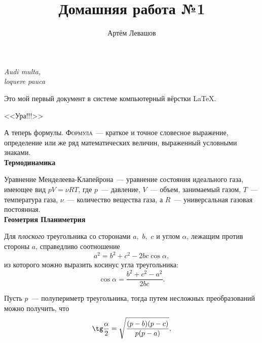 \documentclass[12pt]{article}
\title{Домашняя работа №1}
\author{Артём Левашов}
\date{}
\begin{document}
	\maketitle
	\begin{flushright}
		{\itshape Audi multa,\\loquere pauca}
	\end{flushright}
	
	\vspace{20pt}
	Это мой первый документ в системе компьютерный вёрстки \LaTeX.
	\begin{center}
		\textsf{\huge{<<Ура!!!>>}}
	\end{center}
	\par А теперь формулы. \textsc{Формула}~--- краткое и точное словесное выражение, 
	определение или же ряд математических величин, выраженный условными знаками.
	\vspace{15pt}\\
	\hspace*{28pt}	
	\textbf{\large{Термодинамика}}
	\par Уравнение Менделеева-Клапейрона~--- уравнение состояния идеального газа,
	имеющее вид $pV = \nu RT$, где $p$~--- давление, $V$~--- объем, занимаемый газом, 
	$T$~--- температура газа, $\nu$~--- количество вещества газа, а $R$~--- универсальная 
	газовая постоянная.
	\vspace{15pt}\\
	\hspace*{28pt} \textbf{\large{Геометрия \hfill Планиметрия}}
	\par Для \textsl{плоского} треугольника со сторонами $a,$ $b,$ $c$ и углом $\alpha$, 
	лежащим против стороны $a$, справедливо соотношение
	\[
		a^2 = b^2 + c^2 - 2bc\cos\alpha,
	\]
	из которого можно выразить косинус угла треугольника:
	\[
		\cos\alpha = \frac{b^2 + c^2 - a^2}{2bc}.
	\]
	\par Пусть $p$~--- полупериметр треугольника, тогда путем несложных преобразований
	можно получить, что
	\[
		\tg\frac{\alpha}{2} = \sqrt{\frac{(p-b)(p-c)}{p(p-a)}},	
	\]
	\vspace{1cm}
\end{document}
